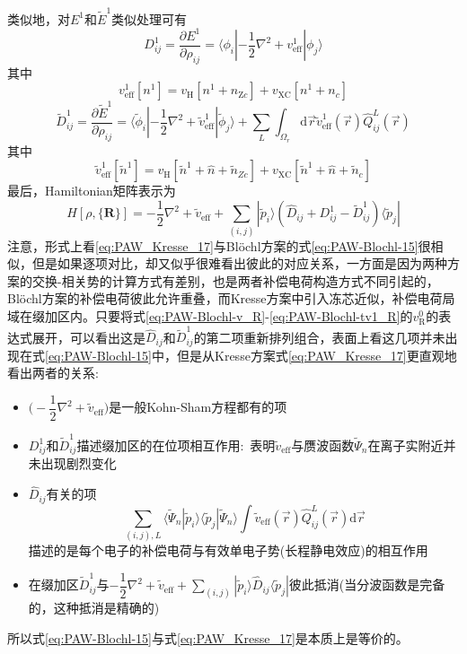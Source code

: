 类似地，对$E^1$和$\tilde E^1$类似处理可有
$$D_{ij}^1=\dfrac{\partial E^1}{\partial\rho_{ij}}=\langle\phi_i|-\dfrac12\nabla^2+v_{\mathrm{eff}}^1|\phi_j\rangle$$
其中$$v_{\mathrm{eff}}^1[n^1]=v_{\mathrm{H}}[n^1+n_{\mathrm{Z}c}]+v_{\mathrm{XC}}[n^1+n_c]$$
	$$\tilde D_{ij}^1=\dfrac{\partial\tilde E^1}{\partial\rho_{ij}}=\langle\tilde\phi_i|-\dfrac12\nabla^2+\tilde v_{\mathrm{eff}}^1|\tilde\phi_j\rangle+\sum_L\int_{\Omega_r}\mathrm{d}\vec r\tilde v_{\mathrm{eff}}^1(\vec r)\hat Q_{ij}^L(\vec r)$$
其中$$\tilde v_{\mathrm{eff}}^1[\tilde n^1]=v_{\mathrm{H}}[\tilde n^1+\hat n+\tilde n_{Zc}]+v_{\mathrm{XC}}[\tilde n^1+\hat n+\tilde n_c]$$
最后，\textrm{Hamiltonian}矩阵表示为
\begin{equation}
	H[\rho,\{\mathbf{R}\}]=-\dfrac12\nabla^2+\tilde v_{\mathrm{eff}}+\sum_{(i,j)}|\tilde p_i\rangle(\hat D_{ij}+D_{ij}^1-\tilde D_{ij}^1)\langle\tilde p_j|
		\label{eq:PAW_Kresse_17}
\end{equation}
注意，形式上看\eqref{eq:PAW_Kresse_17}与\textrm{Bl\"ochl}方案的式\eqref{eq:PAW-Blochl-15}很相似，但是如果逐项对比，却又似乎很难看出彼此的对应关系，一方面是因为两种方案的交换-相关势的计算方式有差别，也是两者补偿电荷构造方式不同引起的，\textrm{Bl\"ochl}方案的补偿电荷彼此允许重叠，而\textrm{Kresse}方案中引入冻芯近似，补偿电荷局域在缀加区内。只要将式\eqref{eq:PAW-Blochl-v_R}-\eqref{eq:PAW-Blochl-tv1_R}的$v_{\mathrm R}^0$的表达式展开，可以看出这是$\hat D_{ij}$和$\tilde D_{ij}^1$的第二项重新排列组合，表面上看这几项并未出现在式\eqref{eq:PAW-Blochl-15}中，但是从\textrm{Kresse}方案式\eqref{eq:PAW_Kresse_17}更直观地看出两者的关系:
\begin{itemize}
	\item $\bigg(-\dfrac12\nabla^2+\tilde v_{\mathrm{eff}}\bigg)$是一般\textrm{Kohn-Sham}方程都有的项
	\item $D_{ij}^1$和$\tilde D_{ij}^1$描述缀加区的在位项相互作用:~表明$\tilde v_{\mathrm{eff}}$与赝波函数$\tilde\Psi_n$在离子实附近并未出现剧烈变化
	\item $\hat D_{ij}$有关的项
		$$\sum_{(i,j),L}\langle\tilde\Psi_n|\tilde p_i\rangle\langle\tilde p_j|\tilde\Psi_n\rangle\int\tilde v_{\mathrm{eff}}(\vec r)\hat Q_{ij}^L(\vec r)\mathrm{d}\vec r$$
		描述的是每个电子的补偿电荷与有效单电子势(长程静电效应)的相互作用
	\item 在缀加区$\tilde D_{ij}^1$与$-\dfrac12\nabla^2+\tilde v_{\mathrm{eff}}+\sum\limits_{(i,j)}|\tilde p_i\rangle\hat D_{ij}\langle\tilde p_j|$彼此抵消(当分波函数是完备的，这种抵消是精确的)
\end{itemize}
所以式\eqref{eq:PAW-Blochl-15}与式\eqref{eq:PAW_Kresse_17}是本质上是等价的。

